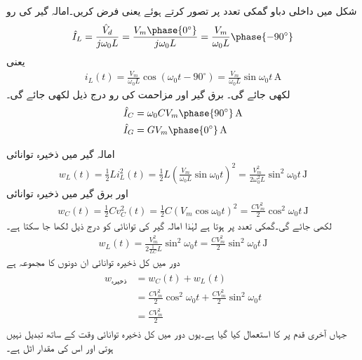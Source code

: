 شکل  میں داخلی دباو گمکی تعدد پر تصور کرتے ہوئے  یعنی  فرض کریں۔امالہ گیر کی رو
\begin{align}\label{مساوات_تعددی_متوازی_رو_الف}
\hat{I}_L=\frac{\hat{V}_d}{j\omega_0 L}=\frac{V_m\phase{0^{\circ}}}{j\omega_0 L}=\frac{V_m}{\omega_0 L}\phase{-90^{\circ}}
\end{align}
یعنی
\begin{align*}
i_L(t)=\frac{V_m}{\omega_0 L} \cos (\omega_0 t -90^{\circ})=\frac{V_m}{\omega_0 L} \sin \omega_0 t \,\si{\ampere}
\end{align*}
لکھی جائے گی۔ برق گیر اور مزاحمت کی رو درج ذیل لکھی جائے گی۔
\begin{gather}
\begin{aligned}\label{مساوات_تعددی_متوازی_رو_ب}
\hat{I}_C&=\omega_0 C V_m \phase{90^{\circ}} \, \si{\ampere}\\
\hat{I}_G&=GV_m\phase{0^{\circ}}\,\si{\ampere}
\end{aligned}
\end{gather}

امالہ گیر میں ذخیرہ توانائی
\begin{align}\label{مساوات_تعددی_متوازی_امالی_ذخیرہ_توانائی}
w_L(t)=\frac{1}{2} L i_L^2(t)=\frac{1}{2} L \left(\frac{V_m}{\omega_0 L} \sin \omega_0 t\right)^2=\frac{V_m^2}{2\omega_0^2 L}\sin^2 \omega_0 t \, \si{\joule}
\end{align}
اور برق گیر میں ذخیرہ توانائی
\begin{align*}
w_C(t)=\frac{1}{2} C v_C^2(t)=\frac{1}{2} C\left(V_m \cos \omega_0 t\right)^2=\frac{CV_m^2}{2}\cos^2 \omega_0 t \, \si{\joule}
\end{align*}
لکھی جائے گی۔گمکی تعدد پر  ہوتا ہے لہٰذا امالہ گیر کی توانائی کو درج ذیل لکھا جا سکتا ہے۔
\begin{align}\label{مساوات_تعددی_متوازی_امالہ_گیر_ذخیرہ_توانائی}
w_L(t)=\frac{V_m^2}{2\frac{1}{LC} L}\sin^2 \omega_0 t=\frac{CV_m^2}{2}\sin^2 \omega_0 t \, \si{\joule}
\end{align}
دور میں کل ذخیرہ توانائی ان دونوں کا مجموعہ ہے
\begin{gather}
\begin{aligned}\label{مساوات_تعددی_متوازی_کل_ذخیرہ_توانائی}
w_{\text{ذخیرہ}}&=w_C(t)+w_L(t)\\
&=\frac{CV_m^2}{2}\cos^2 \omega_0 t+\frac{CV_m^2}{2}\sin^2 \omega_0 t\\
&=\frac{CV_m^2}{2}
\end{aligned}
\end{gather}
جہاں آخری قدم پر  کا استعمال کیا گیا ہے۔یوں دور میں کل ذخیرہ توانائی وقت کے ساتھ تبدیل نہیں ہوتی اور اس کی مقدار اٹل ہے۔

